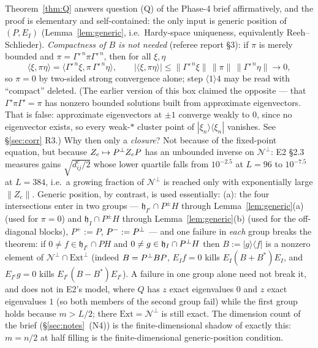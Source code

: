 \documentclass[11pt]{article}
\newcommand{\norm}[1]{\lVert #1\rVert}\newcommand{\abs}[1]{\lvert #1\rvert}
\newcommand{\ip}[2]{\langle #1,#2\rangle}\newcommand{\one}{\mathbf 1}
\providecommand{\ket}[1]{|#1\rangle}\providecommand{\bra}[1]{\langle #1|}
\newcommand{\Ext}{\mathrm{Ext}}\newcommand{\Nvis}{\mathcal N}
\begin{document}
\begin{verdictok}
Theorem~\ref{thm:Q} answers question (Q) of the Phase-4 brief affirmatively, and the proof is
elementary and self-contained: the only input is generic position of $(P,E_I)$
(Lemma~\ref{lem:generic}, i.e.\ Hardy-space uniqueness, equivalently Reeh--Schlieder).
\emph{Compactness of $B$ is not needed} (referee report \S3): if $\pi$ is merely bounded and
$\pi=\Gamma'^{\,n}\pi\Gamma'^{\,n}$, then for all $\xi,\eta$
\[
 \ip\xi{\pi\eta}=\ip{\Gamma'^{\,n}\xi}{\pi\,\Gamma'^{\,n}\eta},\qquad
 \abs{\ip\xi{\pi\eta}}\le\norm{\Gamma'^{\,n}\xi}\,\norm\pi\,\norm{\Gamma'^{\,n}\eta}\to0,
\]
so $\pi=0$ by two-sided strong convergence alone; step $\langle1\rangle4$ may be read with
``compact'' deleted.  (The earlier version of this box claimed the opposite --- that
$\Gamma'\pi\Gamma'=\pi$ has nonzero bounded solutions built from approximate eigenvectors.  That
is false: approximate eigenvectors at $\pm1$ converge weakly to $0$, since no eigenvector
exists, so every weak-$*$ cluster point of $\ket{\xi_n}\bra{\xi_n}$ vanishes.  See
\S\ref{sec:corr} R3.)  Why then only a \emph{closure}?  Not because of the fixed-point
equation, but because $Z_e\mapsto P^{\perp} Z_eP$ has an unbounded inverse on $\Nvis^\perp$: E2
\S2.3 measures gains $\sqrt{d^c_{ij}/2}$ whose lower quartile falls from $10^{-2.5}$ at $L=96$
to $10^{-7.5}$ at $L=384$, i.e.\ a growing fraction of $\Nvis^\perp$ is reached only with
exponentially large $\norm{Z_e}$.  Generic position, by contrast, is used essentially:
  (a): the four
intersections enter in two groups --- $\mathfrak h_{I^c}\cap P^{\pm}H$ through
Lemma~\ref{lem:generic}(a) (used for $\pi=0$) and $\mathfrak h_I\cap P^{\pm}H$ through
Lemma~\ref{lem:generic}(b) (used for the off-diagonal blocks), $P^+:=P$, $P^-:=P^{\perp}$ --- and one
failure in \emph{each} group breaks the theorem: if $0\ne f\in\mathfrak h_{I^c}\cap PH$ and
$0\ne g\in\mathfrak h_I\cap P^{\perp} H$ then $B:=\ket g\bra f$ is a nonzero element of
$\Nvis^\perp\cap\Ext^\perp$ (indeed $B=P^{\perp} BP$, $E_If=0$ kills $E_I(B+B^*)E_I$, and
$E_{I^c}g=0$ kills $E_{I^c}(B-B^*)E_{I^c}$).  A failure in one group alone need not break it, and
does not in E2's model, where $Q$ has $z$ exact eigenvalues $0$ and $z$ exact eigenvalues $1$
(so both members of the second group fail) while the first group holds because $m>L/2$; there
$\Ext=\Nvis^\perp$ is still exact.  The dimension count of the brief
(\S\ref{sec:notes}~(N4)) is the finite-dimensional shadow of exactly this: $m=n/2$ at half filling
is the finite-dimensional generic-position condition.
\end{verdictok}
\end{document}
